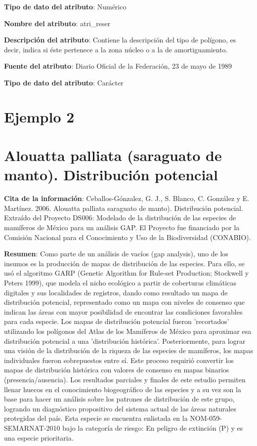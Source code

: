 \documentclass[twoside]{book}
\begin{document}
{{\textbf{Tipo de dato del atributo}: Numérico

\textbf{Nombre del atributo}: atri\_reser

\textbf{Descripción del atributo}: Contiene la descripción del tipo de polígono, es decir, indica si éste pertenece a la zona núcleo o a la de amortiguamiento.

\textbf{Fuente del atributo}: Diario Oficial de la Federación, 23 de mayo de 1989


\textbf{Tipo de dato del atributo}: Carácter

\section*{Ejemplo 2}
\section*{Alouatta palliata (saraguato de manto). Distribución potencial}


\textbf{Cita de la información}: Ceballos-Gónzalez, G. J., S. Blanco, C. González y E. Martínez. 2006. Alouatta palliata saraguato de manto). Distribución potencial. Extraído del Proyecto DS006: Modelado de la distribución de las especies de mamíferos de México para un análisis GAP. El Proyecto fue financiado por la Comisión Nacional para el Conocimiento y Uso de la Biodiversidad (CONABIO).

\textbf{Resumen}: Como parte de un análisis de vacíos (gap analysis), uno de los insumos es la producción de mapas de distribución de las especies. Para ello, se usó el algoritmo GARP (Genetic Algorithm for Rule-set Production; Stockwell y Peters 1999), que modela el nicho ecológico a partir de coberturas climáticas digitales y sus localidades de registros, dando como resultado un mapa de distribución potencial, representado como un mapa con niveles de consenso que indican las áreas con mayor posibilidad de encontrar las condiciones favorables para cada especie. Los mapas de distribución potencial fueron 'recortados' utilizando los polígonos del Atlas de los Mamíferos de México para aproximar esa distribución potencial a una 'distribución histórica'. Posteriormente, para lograr una visión de la distribución de la riqueza de las especies de mamíferos, los mapas individuales fueron sobrepuestos entre sí. Este proceso requirió convertir los mapas de distribución histórica con valores de consenso en mapas binarios (presencia/ausencia). Los resultados parciales y finales de este estudio permiten llenar huecos en el conocimiento biogeográfico de las especies y a su vez son la base para hacer un análisis sobre los patrones de distribución de este grupo, logrando un diagnóstico propositivo del sistema actual de las áreas naturales protegidas del país. Esta especie se encuentra enlistada en la NOM-059-SEMARNAT-2010 bajo la categoría de riesgo: En peligro de extinción (P) y es una especie prioritaria.

}}
\end{document}
